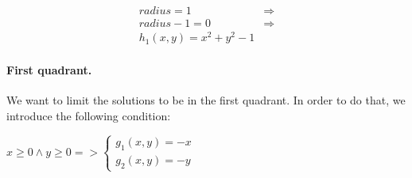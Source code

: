 \begin{minipage}{0.48\linewidth}
    \center
    \begin{equation*}
        \begin{split}
            \mathit{radius} = 1         & \Rightarrow \\
            \mathit{radius} - 1 = 0     & \Rightarrow \\
            h_1(x, y) = x^2 + y^2 - 1     &
        \end{split}
    \end{equation*}
\end{minipage}
\begin{minipage}{0.5\linewidth}
    \center
\end{minipage}

\paragraph{First quadrant.} We want to limit the solutions to be in the first quadrant. In order to do that, we introduce the following condition:

\begin{minipage}{0.49\linewidth}
    \center
    \( 
        x \geq 0 \land y \geq 0 =>  
        \left\{
        \begin{array}{l}
            g_1(x, y) = -x \\
            g_2(x, y) = -y
        \end{array}\right.
    \)
\end{minipage}
\begin{minipage}{0.49\linewidth}
    \center
\end{minipage}

